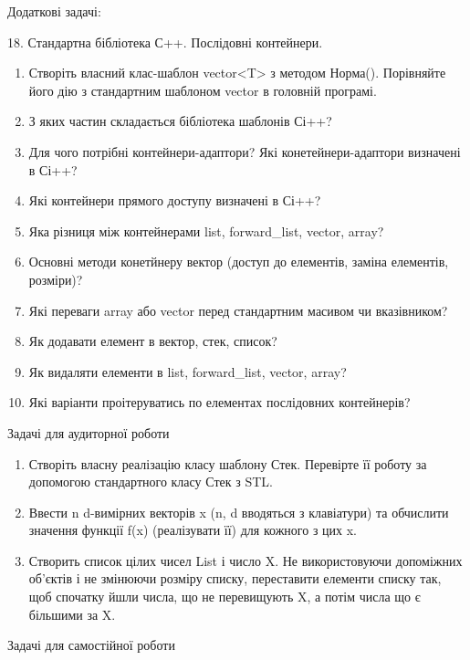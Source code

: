 \documentclass[]{article}
\makeatletter
\newcommand{\xslalph}[1]{\expandafter\@xslalph\csname c@#1\endcsname}
\newcommand{\@xslalph}[1]{%
    \ifcase#1\or а\or б\or в\or г\or д\or e\or є\or ж\or з\or i%
    \or й\or к\or л\or м\or н\or о\or п\or р\or с\or т%
    \or у\or ф\or х\or ц\or ч\or ш\or ю\or я\or аа\or бб\or вв%
    \else\@ctrerr\fi%
}
\makeatother
\begin{document}
\begin{enumerate}
\begin{enumerate}[label=\xslalph*)]
\begin{enumerate}
\begin{enumerate}[label=\xslalph*)]
Додаткові задачі:

18. Стандартна бібліотека С++. Послідовні контейнери.

\begin{enumerate}
\def\labelenumi{\arabic{enumi})}
\item
  Створіть власний клас-шаблон vector\textless{}T\textgreater{} з
  методом Норма(). Порівняйте його дію з стандартним шаблоном vector в
  головній програмі.
\item
  З яких частин складається бібліотека шаблонів Сі++?
\item
  Для чого потрібні контейнери-адаптори? Які конетейнери-адаптори
  визначені в Сі++?
\item
  Які контейнери прямого доступу визначені в Сі++?
\item
  Яка різниця між контейнерами list, forward\_list, vector, array?
\item
  Основні методи конетйнеру вектор (доступ до елементів, заміна
  елементів, розміри)?
\item
  Які переваги array або vector перед стандартним масивом чи
  вказівником?
\item
  Як додавати елемент в вектор, стек, список?
\item
  Як видаляти елементи в list, forward\_list, vector, array?
\item
  Які варіанти проітеруватись по елементах послідовних контейнерів?
\end{enumerate}

Задачі для аудиторної роботи

\begin{enumerate}
\def\labelenumi{\arabic{enumi})}
\item
  Створіть власну реалізацію класу шаблону Стек. Перевірте її роботу за
  допомогою стандартного класу Стек з STL.
\item
  Ввести n d-вимірних векторів x (n, d вводяться з клавіатури) та
  обчислити значення функції f(x) (реалізувати її) для кожного з цих x.
 
   

\item
  Створить список цілих чисел List і число X. Не використовуючи
  допоміжних об'єктів і не змінюючи розміру списку, переставити елементи
  списку так, щоб спочатку йшли числа, що не перевищують X, а потім
  числа що є більшими за X.
\end{enumerate}

Задачі для самостійної роботи


\end{enumerate}
\end{enumerate}
\end{enumerate}
\end{enumerate}
\end{document}
